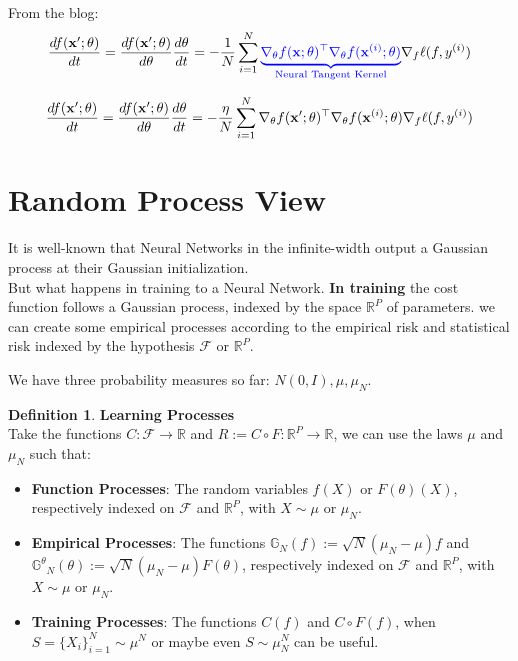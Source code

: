 \documentclass[11pt, a4paper]{article}
\theoremstyle{definition}
\newtheorem{definition}[theorem]{Definition}
\theoremstyle{remark}
\newcommand{\R}{\mathbb{R}}
\begin{document}
From the blog:
	\[
\frac{df(\mathbf{x}';\theta)}{dt} 
= \frac{df(\mathbf{x}';\theta)}{d\theta}\frac{d\theta}{dt}
= -\frac{1}{N} \sum_{i=1}^N \color{blue}{\underbrace{\nabla_\theta f(\mathbf{x};\theta)^\top \nabla_\theta f(\mathbf{x}^{(i)}; \theta)}_\text{Neural Tangent Kernel}    } \color{black}{\nabla_f \ell(f, y^{(i)})}
	\]
	
	\[
	\frac{df(\mathbf{x}';\theta)}{dt} 
	= \frac{df(\mathbf{x}';\theta)}{d\theta}\frac{d\theta}{dt}
	= -\frac{\eta}{N} \sum_{i=1}^N \nabla_\theta f(\mathbf{x}';\theta)^\top \nabla_\theta f(\mathbf{x}^{(i)}; \theta) \color{black}{\nabla_f \ell(f, y^{(i)})}
	\]
	
	\section{Random Process View}
	
	It is well-known that Neural Networks in the infinite-width output a Gaussian process at their Gaussian initialization.\\
	But what happens in training to a Neural Network.
\textbf{In training} the cost function follows a Gaussian process, indexed by the space \(\R^P\) of parameters. we can create some empirical processes according to the empirical risk and statistical risk indexed by the hypothesis \(\mathcal{F}\) or \(\R^P\).
 
We have three probability measures so far: \(N(0,I), \mu, \mu_N\).
\begin{definition}{\textbf{Learning Processes}}\\
Take the functions \(C:\mathcal{F}\to \R\) and \(R:= C\circ F : \R^P \to \R\), we can use the laws \(\mu\) and \(\mu_N\) such that:
\begin{itemize}
	\item \textbf{Function Processes}: The random variables \(f(X)\) or \(F(\theta)(X)\), respectively indexed on \(\mathcal{F}\) and \(\R^P\), with \(X\sim\mu\) or \(\mu_N\).
	
	\item \textbf{Empirical Processes}: The functions \(\mathbb{G}_N(f):=\sqrt{N}(\mu_N - \mu)f\) and  \(\mathbb{G^\theta}_N(\theta):=\sqrt{N}(\mu_N - \mu)F(\theta)\), respectively indexed on \(\mathcal{F}\) and \(\R^P\), with \(X\sim\mu\) or \(\mu_N\).
	
	\item \textbf{Training Processes}: The functions \(C(f)\) and \(C \circ F(f)\), when \(S=\{X_i\}_{i=1}^N \sim \mu^N\) or maybe even \(S\sim \mu_N^N\) can be useful.
	
	
\end{itemize}
\end{definition}
\end{document}
